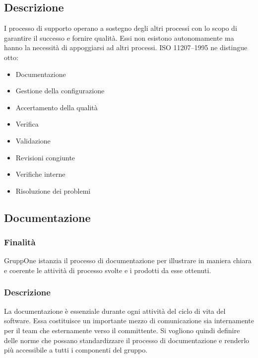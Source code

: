 \documentclass[../norme-di-progetto.tex]{subfiles}
\begin{document}
\subsection{Descrizione}%
\label{sub:processi_di_supporto/descrizione}

I processo di supporto operano a sostegno degli altri processi con lo scopo di garantire il successo e fornire qualità.
Essi non esistono autonomamente ma hanno la necessità di appoggiarsi ad altri processi.
ISO 11207--1995 ne distingue otto:

\begin{itemize}
  \item Documentazione
  \item Gestione della configurazione
  \item Accertamento della qualità
  \item Verifica
  \item Validazione
  \item Revisioni congiunte
  \item Verifiche interne
  \item Risoluzione dei problemi
\end{itemize}

\subsection{Documentazione}%
\label{sub:documentazione}

\subsubsection{Finalità}%
\label{subs:documentazione/finalita}

GruppOne istanzia il processo di documentazione per illustrare in maniera chiara e coerente le attività di processo svolte e i prodotti da esse ottenuti.

\subsubsection{Descrizione}%
\label{subs:documentazione/descrizione}

La documentazione è essenziale durante ogni attività del ciclo di vita del software.
Essa costituisce un importante mezzo di comunicazione sia internamente per il team che esternamente verso il committente.
Si vogliono quindi definire delle norme che possano standardizzare il processo di documentazione e renderlo più accessibile a tutti i componenti del gruppo.
\end{document}

